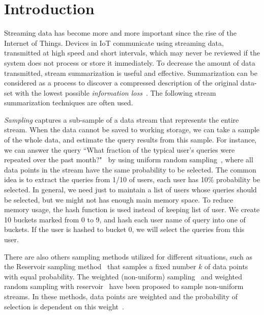 \section{Introduction}

Streaming data has become more and more important since the rise of the Internet
of Things. Devices in IoT communicate using streaming data, transmitted
at high speed and short intervals, which may never be reviewed if the system
does not process or store it immediately. To decrease the amount of data
transmitted, stream summarization is useful and effective. Summarization can
be considered as a process to discover a compressed description of the original data-set with the lowest possible \emph{information
loss}~\cite{chandola2007summarization}.
The following stream summarization techniques are often used.

\emph{Sampling} captures a sub-sample of a data stream that represents the
entire stream. When the data cannot be saved to working storage,
we can take a sample of the whole data, and estimate the query results from this sample.
For instance, we can answer the query ``What
fraction of the typical user's queries were repeated over the past
month?"~\cite{leskovec2014mining} by using
uniform random sampling~\cite{vitter1984faster, Ahrens1985SequentialRS}, where
all data points in  the stream have the same probability to be selected. The common idea is
to extract the queries from 1/10 of users, each user has 10\% probability be
selected. In general, we need just to maintain a list of users whose queries
should be selected, but we might not has enough main memory space. To reduce
memory usage, the hash function is used instead of keeping list of user. We
create 10 buckets marked from 0 to 9, and hash each user name of query into one
of buckets. If the user is hashed to bucket 0, we will select the queries from
this user. 

There are also others sampling methods utilized for different situations, such as the
Reservoir sampling method~\cite{vitter1985random, vitter1985random,
Aggarwal2007DataS} that samples a fixed number $k$  of data points with equal probability.
The weighted (non-uniform) sampling~\cite{chaudhuri1999random} and
weighted random sampling with reservoir~\cite{efraimidis2006weighted} have been
proposed to sample non-uniform streams. In these methods, data points are
weighted and the probability of selection is dependent on this
weight~\cite{chaudhuri1999random}.



